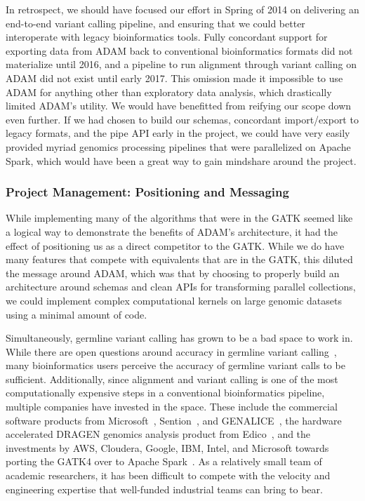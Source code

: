 \documentclass[phd]{ucbthesis}
\begin{document}
In retrospect, we should have focused our effort in Spring of 2014 on delivering
an end-to-end variant calling pipeline, and ensuring that we could better
interoperate with legacy bioinformatics tools. Fully concordant support for
exporting data from ADAM back to conventional bioinformatics formats did not
materialize until 2016, and a pipeline to run alignment through variant calling
on ADAM did not exist until early 2017. This omission made it impossible to use ADAM for
anything other than exploratory data analysis, which drastically limited ADAM's
utility. We would have benefitted from reifying our scope down even further. If
we had chosen to build our schemas, concordant import/export to legacy formats,
and the pipe API early in the project, we could have very easily provided
myriad genomics processing pipelines that were parallelized on Apache Spark,
which would have been a great way to gain mindshare around the project.

\subsubsection{Project Management: Positioning and Messaging}
\label{sec:fail-positioning}

While implementing many of the algorithms that were in the GATK seemed like a
logical way to demonstrate the benefits of ADAM's architecture, it had the
effect of positioning us as a direct competitor to the GATK. While we do
have many features that compete with equivalents that are in the GATK, this
diluted the message around ADAM, which was that by choosing to properly build
an architecture around schemas and clean APIs for transforming parallel
collections, we could implement complex computational kernels on large genomic
datasets using a minimal amount of code.

Simultaneously, germline variant calling has grown to be a bad space to work
in. While there are open questions around accuracy in germline variant
calling~\cite{li14}, many bioinformatics users perceive the accuracy of germline
variant calls to be sufficient. Additionally, since alignment and variant
calling is one of the most computationally expensive steps in a conventional
bioinformatics pipeline, multiple companies have invested in the space. These
include the commercial software products from Microsoft~\cite{msr16},
Sention~\cite{freed17}, and GENALICE~\cite{pluss17}, the hardware accelerated
DRAGEN genomics analysis product from Edico~\cite{dragen}, and the investments
by AWS, Cloudera, Google, IBM, Intel, and Microsoft towards porting the GATK4
over to Apache Spark~\cite{broad16}. As a relatively small team of academic
researchers, it has been difficult to compete with the velocity and engineering
expertise that well-funded industrial teams can bring to bear.
\end{document}
